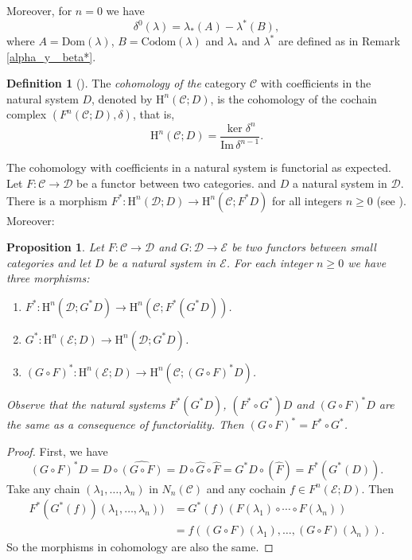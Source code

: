 \documentclass[12pt,reqno]{amsart}
\newtheorem{prop}[teo]{Proposition}
\theoremstyle{definition}
\newtheorem{defi}[teo]{Definition}
\theoremstyle{remark}
\numberwithin{figure}{section}%
\newcommand{\CC}{\mathcal{C}}
\newcommand{\Dc}{\mathcal{D}}
\newcommand{\Ho}{\mathrm{H}}
\newcommand{\E}{\mathcal{E}}
\newcommand{\Ima}{\mathrm{Im}}
\begin{document}

Moreover, for $n=0$ we have $$\delta^0(\lambda)=\lambda_{*}(A)-\lambda^*(B),$$ where $A=\mathrm{Dom}(\lambda)$, $B=\mathrm{Codom}(\lambda)$ and $\lambda_*$ and $\lambda^*$ are defined as in Remark \ref{alpha_y _beta*}.


\begin{defi}[\cite{BAUES0,BAUES1}]\label{def:cohomo_Baues}
The {\em cohomology of the} category $\CC$ with coefficients in the natural system $D$, denoted by $\Ho^n(\CC;D)$, is the cohomology of the cochain complex $(F^n(\CC;D),\delta)$, that is,
$$ \Ho^n(\CC;D)= \frac{\ker \delta^{n}}{\Ima \, \delta^{n-1}}.$$
\end{defi}



The cohomology with coefficients in a natural system is functorial as expected. Let $F\colon \CC \rightarrow \Dc$ be a functor between two categories. and $D$ a natural system in $\Dc$. There is a morphism $F^*\colon \Ho^n(\Dc; D) \rightarrow \Ho^n(\CC;F^*D)$ for all integers $n\geq 0$ (see \cite{BAUES0,BAUES1}). Moreover:

\begin{prop}

    Let $F\colon \CC \rightarrow \Dc$ and $G\colon \Dc \rightarrow \E$ be two functors between small categories and let $D$ be a natural system in  $\E$.  For each integer $n\geq 0$ we have three morphisms:
    \begin{enumerate}
        \item $F^*\colon\Ho^n(\Dc; G^*D) \rightarrow \Ho^n(\CC; F^*(G^*D))$.
        \item $G^*\colon\Ho^n(\E; D) \rightarrow \Ho^n(\Dc; G^*D)$.
        \item $(G\circ F)^*\colon\Ho^n(\E;  D) \rightarrow \Ho^n(\CC; (G \circ F)^*D)$.
    \end{enumerate}
    Observe that the natural systems $F^*(G^*D)$, $(F^*\circ G^*)D$ and $(G \circ F)^*D$ are the same as a consequence of functoriality. Then $(G\circ F)^*=F^* \circ G^*$.
\end{prop}
\begin{proof}
First, we have 
$$(G \circ F)^*D= D \circ \widehat{(G \circ F)}= D \circ \widehat{G} \circ \widehat{F}=G^*D \circ (\widehat{F})=F^*( G^*(D)).$$ Take any chain $(\lambda_1,\dots,\lambda_n)$ in $N_n(\CC)$ and any cochain $f \in F^n(\E;D)$. Then 
\begin{align*}
    F^*(G^*(f))(\lambda_1,\dots,\lambda_n))&=G^*(f)(F(\lambda_1)\circ \cdots \circ F(\lambda_n))\\&=f((G \circ F)(\lambda_1),\dots,(G \circ F)(\lambda_n)).
\end{align*} So the morphisms in cohomology are also the same.
\end{proof}
\end{document}
